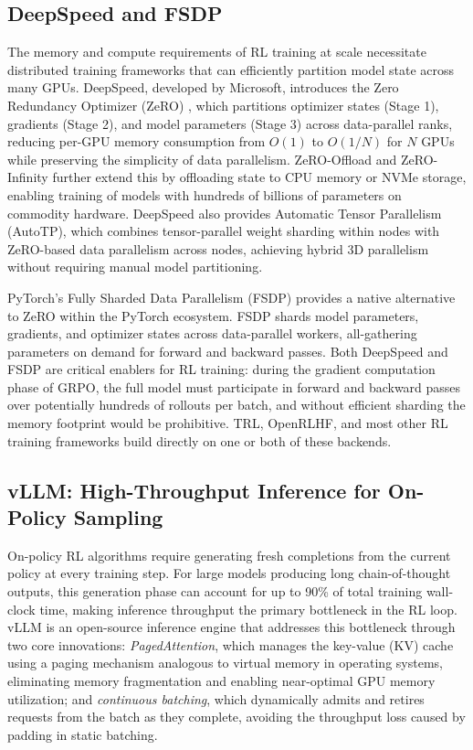 \subsection{DeepSpeed and FSDP}

The memory and compute requirements of RL training at scale necessitate distributed training frameworks that can efficiently partition model state across many GPUs. DeepSpeed, developed by Microsoft, introduces the Zero Redundancy Optimizer (ZeRO) \cite{rajbhandari2020zero}, which partitions optimizer states (Stage 1), gradients (Stage 2), and model parameters (Stage 3) across data-parallel ranks, reducing per-GPU memory consumption from $O(1)$ to $O(1/N)$ for $N$ GPUs while preserving the simplicity of data parallelism. ZeRO-Offload and ZeRO-Infinity further extend this by offloading state to CPU memory or NVMe storage, enabling training of models with hundreds of billions of parameters on commodity hardware. DeepSpeed also provides Automatic Tensor Parallelism (AutoTP), which combines tensor-parallel weight sharding within nodes with ZeRO-based data parallelism across nodes, achieving hybrid 3D parallelism without requiring manual model partitioning.

PyTorch's Fully Sharded Data Parallelism (FSDP) provides a native alternative to ZeRO within the PyTorch ecosystem. FSDP shards model parameters, gradients, and optimizer states across data-parallel workers, all-gathering parameters on demand for forward and backward passes. Both DeepSpeed and FSDP are critical enablers for RL training: during the gradient computation phase of GRPO, the full model must participate in forward and backward passes over potentially hundreds of rollouts per batch, and without efficient sharding the memory footprint would be prohibitive. TRL, OpenRLHF, and most other RL training frameworks build directly on one or both of these backends.

\subsection{vLLM: High-Throughput Inference for On-Policy Sampling}

On-policy RL algorithms require generating fresh completions from the current policy at every training step. For large models producing long chain-of-thought outputs, this generation phase can account for up to 90\% of total training wall-clock time, making inference throughput the primary bottleneck in the RL loop. vLLM \cite{kwon2023vllm} is an open-source inference engine that addresses this bottleneck through two core innovations: \textit{PagedAttention}, which manages the key-value (KV) cache using a paging mechanism analogous to virtual memory in operating systems, eliminating memory fragmentation and enabling near-optimal GPU memory utilization; and \textit{continuous batching}, which dynamically admits and retires requests from the batch as they complete, avoiding the throughput loss caused by padding in static batching.

